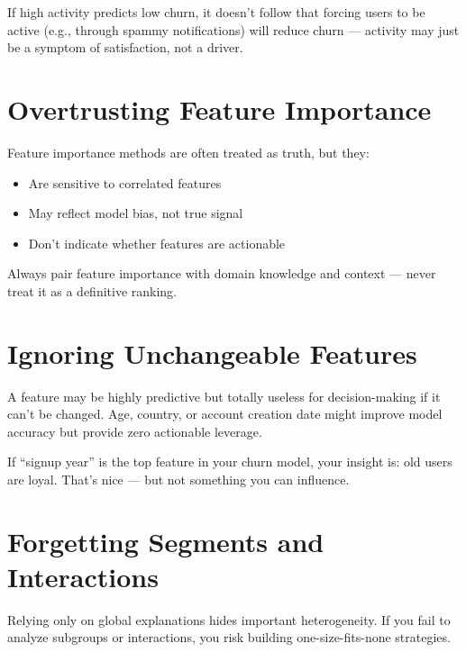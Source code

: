 \documentclass[12pt,openany]{book}
\begin{document}
\begin{examplebox}
If high activity predicts low churn, it doesn’t follow that forcing users to be active (e.g., through spammy notifications) will reduce churn — activity may just be a symptom of satisfaction, not a driver.
\end{examplebox}



\section{Overtrusting Feature Importance}

Feature importance methods are often treated as truth, but they:
\begin{itemize}
  \item Are sensitive to correlated features
  \item May reflect model bias, not true signal
  \item Don’t indicate whether features are actionable
\end{itemize}

\begin{notebox}
Always pair feature importance with domain knowledge and context — never treat it as a definitive ranking.
\end{notebox}



\section{Ignoring Unchangeable Features}

A feature may be highly predictive but totally useless for decision-making if it can’t be changed. Age, country, or account creation date might improve model accuracy but provide zero actionable leverage.

\begin{examplebox}
If “signup year” is the top feature in your churn model, your insight is: old users are loyal. That’s nice — but not something you can influence.
\end{examplebox}



\section{Forgetting Segments and Interactions}

Relying only on global explanations hides important heterogeneity. If you fail to analyze subgroups or interactions, you risk building one-size-fits-none strategies.
\end{document}
